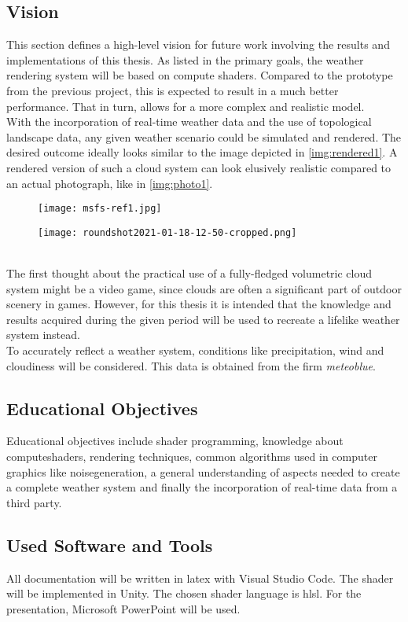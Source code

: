 \subsection{Vision}
This section defines a high-level vision for future work involving the results and implementations of this thesis. 
As listed in the primary goals, the weather rendering system will be based on compute shaders.
Compared to the prototype from the previous project, this is expected to result in a much better performance.
That in turn, allows for a more complex and realistic model.
\\
With the incorporation of real-time weather data and the use of topological landscape data, any given weather scenario could be simulated and rendered.
The desired outcome ideally looks similar to the image depicted in \autoref{img:rendered1}.
A rendered version of such a cloud system can look elusively realistic compared to an actual photograph, like in \autoref{img:photo1}.
\begin{figure}[ht]
    \centering
        \begin{minipage}{0.47\linewidth}
            \texttt{[image: msfs-ref1.jpg]}
            \label{img:rendered1}
        \end{minipage}
    \hfill
        \begin{minipage}{0.47\linewidth}
            \texttt{[image: roundshot2021-01-18-12-50-cropped.png]}
            \label{img:photo1}        
        \end{minipage}  
\end{figure}
\\
The first thought about the practical use of a fully-fledged volumetric cloud system might be a video game, since clouds are often a significant part of outdoor scenery in games.
However, for this thesis it is intended that the knowledge and results acquired during the given period will be used to recreate a lifelike weather system instead.
\\
To accurately reflect a weather system, conditions like precipitation, wind and cloudiness will be considered. This data is obtained from the firm \emph{meteoblue}.

\subsection{Educational Objectives}
Educational objectives include \gls{shader} programming, knowledge about \gls{computeshader}s, rendering techniques, common algorithms used in computer graphics like \gls{noisegeneration}, a general understanding of aspects needed to create a complete weather system and finally the incorporation of real-time data from a third party.

\subsection{Used Software and Tools}
All documentation will be written in \gls{latex} with Visual Studio Code.
The \gls{shader} will be implemented in Unity. The chosen \gls{shader} language is \gls{hlsl}.
For the presentation, Microsoft PowerPoint will be used.